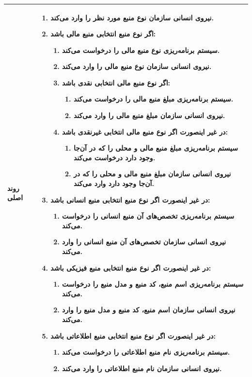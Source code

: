 \begin{table}[H]
\begin{tabular}{|p{3cm}|p{10cm}|}
		
		روند اصلی &
		\begin{enumerate}[topsep=0cm,leftmargin=0.5cm]
			\item نیروی انسانی سازمان نوع منبع مورد نظر را وارد می‌کند. 
			\item اگر نوع منبع انتخابی منبع مالی باشد:
			\begin{enumerate}[topsep=0cm,leftmargin=0.5cm]
				\item سیستم برنامه‌ریزی نوع منبع مالی را درخواست می‌کند.
				\item نیروی انسانی سازمان نوع منبع مالی را وارد می‌کند.
				\item اگر نوع منبع مالی انتخابی نقدی باشد:
				\begin{enumerate}[topsep=0cm,leftmargin=0.5cm]
					\item سیستم برنامه‌ریزی مبلغ منبع مالی را درخواست می‌کند.
					\item نیروی انسانی سازمان مبلغ منبع مالی را وارد می‌کند.
				\end{enumerate}
				\item در غیر اینصورت اگر نوع منبع مالی انتخابی غیرنقدی باشد:
				\begin{enumerate}[topsep=0cm,leftmargin=0.5cm]
					\item سیستم برنامه‌ریزی مبلغ منبع مالی و محلی را که در آن‌جا وجود دارد درخواست می‌کند.
					\item نیروی انسانی سازمان مبلغ منبع مالی و محلی را که در آن‌جا وجود دارد وارد می‌کند.
				\end{enumerate}	
			\end{enumerate}
			\item در غیر اینصورت اگر نوع منبع انتخابی منبع انسانی باشد:
			\begin{enumerate}[topsep=0cm,leftmargin=0.5cm]
				\item  سیستم برنامه‌ریزی تخصص‌های آن منبع انسانی را درخواست می‌کند.
				\item  نیروی انسانی سازمان تخصص‌های آن منبع انسانی را وارد می‌کند.
			\end{enumerate}
			\item در غیر اینصورت اگر نوع منبع انتخابی منبع فیزیکی باشد:
			\begin{enumerate}[topsep=0cm,leftmargin=0.5cm]
				\item  سیستم برنامه‌ریزی اسم منبع، کد منبع و مدل منبع را درخواست می‌کند.
				\item نیروی انسانی سازمان اسم منبع، کد منبع و مدل منبع را وارد می‌کند.
			\end{enumerate}
			\item در غیر اینصورت اگر نوع منبع انتخابی منبع اطلاعاتی باشد:
			\begin{enumerate}[topsep=0cm,leftmargin=0.5cm]
				\item  سیستم برنامه‌ریزی نام منبع اطلاعاتی را درخواست می‌کند.
				\item  نیروی انسانی سازمان نام منبع اطلاعاتی را وارد می‌کند.
			\end{enumerate}
		\end{enumerate} \\
		\hline
		

\end{tabular}
\end{table}
